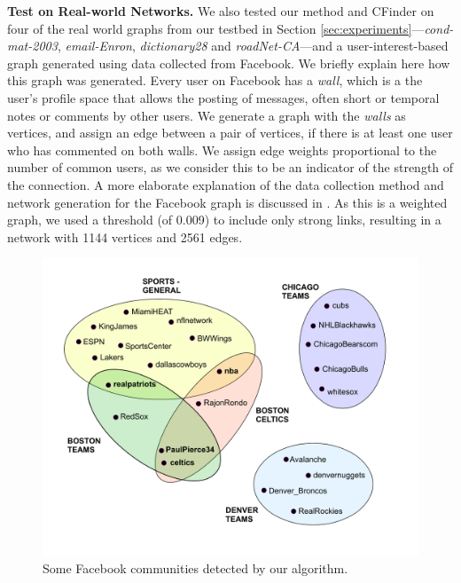 {\bf Test on Real-world Networks. } We also tested our method and CFinder on four of the real world graphs from our testbed in Section \ref{sec:experiments}---{\em cond-mat-2003}, {\em email-Enron}, {\em dictionary28} and {\em roadNet-CA}---and a user-interest-based graph generated using data collected from Facebook. We briefly explain here how this graph was generated.
Every user on Facebook has a {\it wall}, which is a the user's profile space that allows the posting of messages, often short or temporal notes or comments by other users. We generate a graph with the {\it walls} as vertices, and assign an edge between a pair of vertices, if there is at least one user who has commented on both walls. We assign edge weights proportional to the number of common users, as we consider this to be an indicator of the strength of the connection. A more elaborate explanation of the data collection method and network generation  for the Facebook graph is discussed in \cite{dianapaper}. As this is a weighted graph, we used a threshold (of 0.009) to include only strong links, resulting in a network with 1144 vertices and 2561 edges.

\begin{figure}[h!]
  \centering
    \includegraphics[scale=0.35]{communities_fb_new.pdf}
    
  \caption{Some Facebook communities detected by our algorithm.}
\label{fig-communities-fb}
\end{figure}

